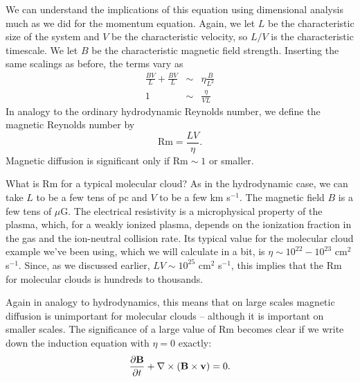 We can understand the implications of this equation using dimensional analysis much as we did for the momentum equation. Again, we let $L$ be the characteristic size of the system and $V$ be the characteristic velocity, so $L/V$ is the characteristic timescale. We let $B$ be the characteristic magnetic field strength. Inserting the same scalings as before, the terms vary as
\begin{eqnarray}
\frac{BV}{L} + \frac{BV}{L} & \sim & \eta \frac{B}{L^2} \\
1 & \sim & \frac{\eta}{VL}
\end{eqnarray}
In analogy to the ordinary hydrodynamic Reynolds number, we define the magnetic Reynolds number by
\begin{equation}
\mbox{Rm} = \frac{LV}{\eta}.
\end{equation}
Magnetic diffusion is significant only if $\mathrm{Rm} \sim 1$ or smaller.

What is Rm for a typical molecular cloud? As in the hydrodynamic case, we can take $L$ to be a few tens of pc and $V$ to be a few km s$^{-1}$. The magnetic field $B$ is a few tens of $\mu$G. The electrical resistivity is a microphysical property of the plasma, which, for a weakly ionized plasma, depends on the ionization fraction in the gas and the ion-neutral collision rate. Its typical value for the molecular cloud example we've been using, which we will calculate in a bit, is $\eta\sim 10^{22}-10^{23}$ cm$^2$ s$^{-1}$. Since, as we discussed earlier, $LV\sim 10^{25}$ cm$^2$ s$^{-1}$, this implies that the Rm for molecular clouds is hundreds to thousands.

Again in analogy to hydrodynamics, this means that on large scales magnetic diffusion is unimportant for molecular clouds -- although it is important on smaller scales. The significance of a large value of Rm becomes clear if we write down the induction equation with $\eta=0$ exactly:
\begin{equation}
\frac{\partial \mathbf{B}}{\partial t} + \nabla \times (\mathbf{B} \times \mathbf{v}) = 0.
\end{equation}

